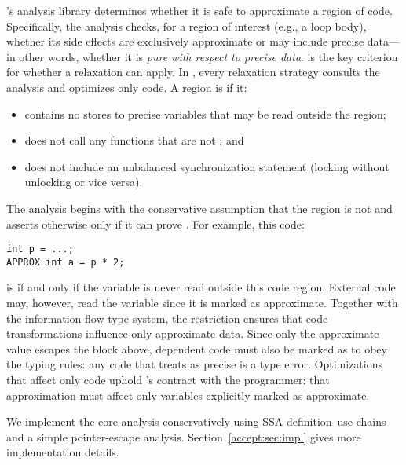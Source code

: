 \sysname's analysis library determines whether it is safe to approximate a
region of code.
Specifically, the \precisepurity analysis checks,
for a region of interest (e.g., a loop body), whether its side
effects are exclusively approximate or may include precise data---in other
words, whether it is \emph{pure with respect to precise data}.
%
\Precisepurity is the key criterion for whether a relaxation can
apply.  In
\sysname, every relaxation strategy consults the \precisepurity
analysis and optimizes only
\precisepure code.
%
A region is \precisepure if it:
\begin{itemize}
\item contains no stores to precise
variables that may be read outside the region;
\item does not call any functions that are not \precisepure; and
\item does not include an unbalanced synchronization statement (locking without
unlocking or vice versa).
\end{itemize}
The analysis begins with the conservative
assumption that the region is not \precisepure and asserts otherwise only if it
can prove \precisepurity.
%
For example, this code:
%
\begin{lstlisting}
int p = ...;
APPROX int a = p * 2;
\end{lstlisting}
%
is \precisepure if and only if the variable  is never read outside this
code region. External code may, however, read the variable  since it is
marked as approximate.
%
Together with the information-flow type system, the \precisepurity restriction
ensures that code transformations influence only approximate data.
Since only the approximate value  escapes the \precisepure block above,
dependent code must also be marked as  to obey the typing rules:
any code that treats  as precise is a type error.
Optimizations that affect only \precisepure code uphold \sysname's
contract with the programmer: that approximation must affect only variables
explicitly marked as approximate.

We implement the core \precisepurity analysis
conservatively using SSA definition--use chains and a simple pointer-escape
analysis.  Section~\ref{accept:sec:impl} gives more implementation details.

\iffalse  %
Each program-relaxation strategy uses the shared \precisepurity analysis to
identify \emph{relaxation-opportunity sites:} places where the transformation
can apply. When \sysname finds an opportunity site, it registers the site along
with any relevant parameters in its catalog of such sites. The autotuner then
uses this catalog to enable a subset of relaxation opportunities and set their
parameters.  Section~\ref{accept:sec:autotuner} describes the autotuning process in more detail.
\fi

